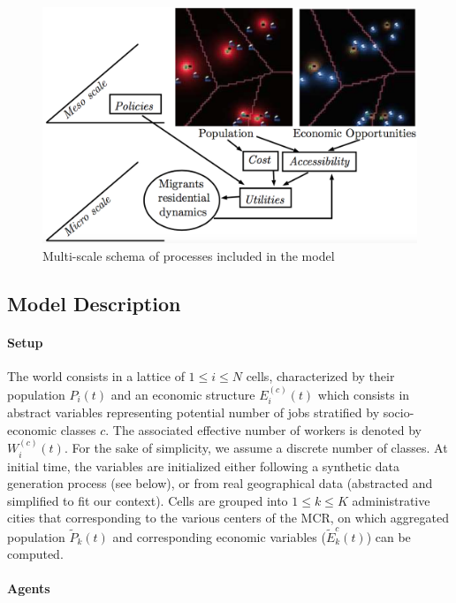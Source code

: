 \begin{figure}
\centering
\includegraphics[width=\textwidth]{figures/model}
\caption{Multi-scale schema of processes included in the model}
\label{fig:model}
\end{figure}


\subsection{Model Description}

\paragraph{Setup}

The world consists in a lattice of $1 \leq i \leq N$ cells, characterized by their population $P_i(t)$ and an economic structure $E_i^{(c)}(t)$ which consists in abstract variables representing potential number of jobs stratified by socio-economic classes $c$. The associated effective number of workers is denoted by $W_i^{(c)}(t)$. For the sake of simplicity, we assume a discrete number of classes. At initial time, the variables are initialized either following a synthetic data generation process (see below), or from real geographical data (abstracted and simplified to fit our context). Cells are grouped into $1\leq k\leq K$ administrative cities that corresponding to the various centers of the MCR, on which aggregated population $\tilde{P}_k(t)$ and corresponding economic variables ($\tilde{E}_k^{c}(t)$) can be computed.

\paragraph{Agents}

